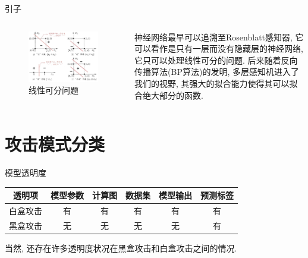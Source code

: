 \documentclass[UTF8, aspectratio=169, 10pt, t]{ctexbeamer}
\begin{document}
\begin{frame}{引子}
	\begin{columns}[c]
		\begin{column}{0.5\textwidth}
			\begin{figure}
				\centering
				\includegraphics[width=0.9\linewidth]{linediv}
				\caption{线性可分问题}
				\label{fig:linediv}
			\end{figure}
			
		\end{column}
		\begin{column}{0.5\textwidth}
			神经网络最早可以追溯至Rosenblatt感知器, 它可以看作是只有一层而没有隐藏层的神经网络, 它只可以处理\alert{线性可分}的问题. 后来随着反向传播算法(BP算法)的发明, 多层感知机进入了我们的视野, 其强大的拟合能力使得其可以拟合绝大部分的函数.
		\end{column}
	\end{columns}
\end{frame}

\section{攻击模式分类}

\begin{frame}{模型透明度}
	
	\begin{tabular}{|c|c|c|c|c|c|}
		\hline
		透明项 & 模型参数 & 计算图 & 数据集 & 模型输出 & 预测标签 \\
		\hline
		白盒攻击 & 有 & 有 & 有 & 有 & 有 \\
		\hline
		黑盒攻击 & 无 & 无 & 无 & 无 & 有 \\
		\hline
	\end{tabular}
	
	\vspace{2em}
	
	当然, 还存在许多透明度状况在黑盒攻击和白盒攻击之间的情况.
	
\end{frame}
\end{document}
